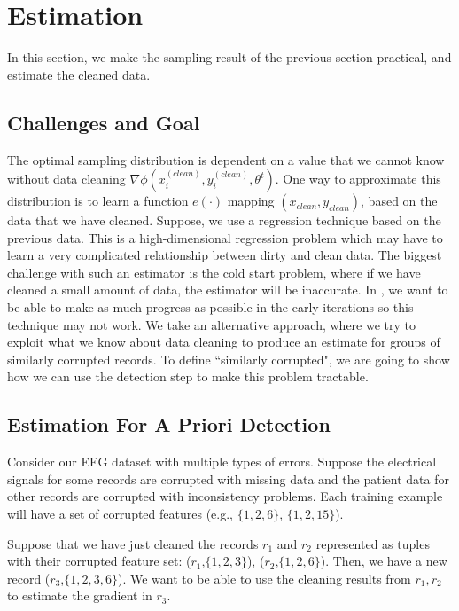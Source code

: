 \section{Estimation}\label{sampling}
In this section, we make the sampling result of the previous section practical,
and estimate the cleaned data.

\subsection{Challenges and Goal}
The optimal sampling distribution is dependent on a value that we cannot know without data cleaning $\nabla\phi(x^{(clean)}_i,y^{(clean)}_i,\theta^t)$.
One way to approximate this distribution is to learn a function $e(\cdot)$ mapping $(x_{clean}, y_{clean})$, based on the data that we have cleaned.
Suppose, we use a regression technique based on the previous data.
This is a high-dimensional regression problem which may have to learn a very complicated relationship between dirty and clean data.
The biggest challenge with such an estimator is the cold start problem, where if we have cleaned a small amount of data, the estimator will be inaccurate.
In \sys, we want to be able to make as much progress as possible in the early iterations so this technique may not work.
We take an alternative approach, where we try to exploit what we know about data cleaning to produce an estimate for groups of similarly corrupted records.
To define ``similarly corrupted", we are going to show how we can use the detection step to make this problem tractable.

\subsection{Estimation For A Priori Detection}
\begin{example}
Consider our EEG dataset with multiple types of errors. 
Suppose the electrical signals for some records are corrupted with missing data and the patient data for other records are corrupted with inconsistency problems. 
Each training example will have a set of corrupted features (e.g., $\{1,2,6\}$, $\{1,2,15\}$).

Suppose that we have just cleaned the records $r_1$ and $r_2$ represented as tuples with their corrupted feature set: ($r_1$,$\{1,2,3\}$), ($r_2$,$\{1,2,6\}$).
Then, we have a new record ($r_3$,$\{1,2,3,6\}$). 
We want to be able to use the cleaning results from $r_1,r_2$ to estimate the gradient in $r_3$.
\end{example}

